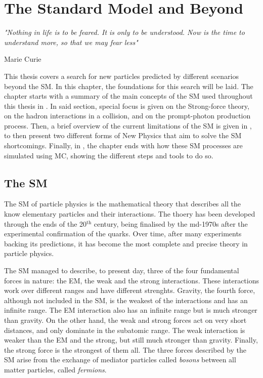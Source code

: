 \chapter{The Standard Model and Beyond}
\label{ch:theory}
\epigraph{\emph{"Nothing in life is to be feared. It is only to be understood. Now is the time to understand more, so that we may fear less"}}{Marie Curie}


This thesis covers a search for new particles predicted by different scenarios beyond the \ac{SM}. In this chapter, the foundations for this search will be laid.
The chapter starts with a summary of the main concepts of the \ac{SM} used throughout this thesis in \Sect{\ref{sec:theory:sm}}. In said section, special focus is given on the Strong-force theory, on the hadron interactions in a \pp collision, and on the prompt-photon production process.
Then, a brief overview of the current limitations of the \ac{SM} is given in \Sect{\ref{sec:theory:bsm}}, to then present two different forms of New Physics that aim to solve the \ac{SM} shortcomings.
Finally, in \Sect{\ref{sec:theory:mc_simulation}}, the chapter ends with how these \ac{SM} processes are simulated using \ac{MC}, showing the different steps and tools to do so.




\section{The \acf{SM}}
\label{sec:theory:sm}

The \acf{SM} of particle physics is the mathematical theory that describes all the know elementary particles and their interactions.
The thoery has been developed through the ends of the 20\(^{\text{th}}\) century, being finalised by the md-1970s after the experimental confirmation of the quarks.
Over time, after many experiments backing its predictions, it has become the most complete and precise theory in particle physics. 

The \ac{SM} managed to describe, to present day, three of the four fundamental forces in nature: the \ac{EM}, the weak and the strong interactions.
These interactions work over different ranges and have different strenghts. Gravity, the fourth force, although not included in the \ac{SM}, is the weakest of the interactions and has an infinite range. The \ac{EM} interaction also has an infinite range but is much stronger than gravity. On the other hand, the weak and strong forces act on very short distances, and only dominate in the subatomic range. The weak interaction is weaker than the \ac{EM} and the strong, but still much stronger than gravity. Finally, the strong force is the strongest of them all.
The three forces described by the \ac{SM} arise from the exchange of mediator particles called \textit{bosons} between all matter particles, called \textit{fermions}.



